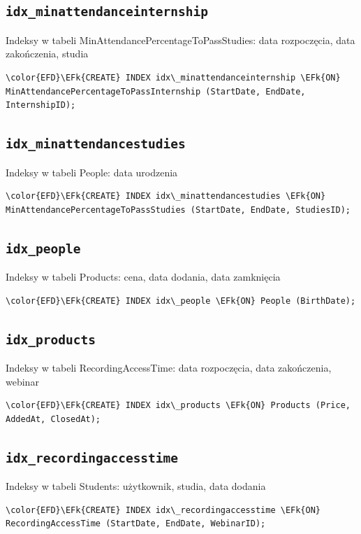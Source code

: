 \documentclass[11pt]{article}
\newcommand{\EFk}[1]{\textcolor{EFk}{\textbf{#1}}} %
\begin{document}
\subsection{\texttt{idx\_minattendanceinternship}}
\label{sec:org7eadbf9}
Indeksy w tabeli MinAttendancePercentageToPassStudies: data rozpoczęcia, data zakończenia, studia
\begin{Code}
\begin{Verbatim}
\color{EFD}\EFk{CREATE} INDEX idx\_minattendanceinternship \EFk{ON} MinAttendancePercentageToPassInternship (StartDate, EndDate, InternshipID);
\end{Verbatim}
\end{Code}
\subsection{\texttt{idx\_minattendancestudies}}
\label{sec:org62e0f5f}
Indeksy w tabeli People: data urodzenia
\begin{Code}
\begin{Verbatim}
\color{EFD}\EFk{CREATE} INDEX idx\_minattendancestudies \EFk{ON} MinAttendancePercentageToPassStudies (StartDate, EndDate, StudiesID);
\end{Verbatim}
\end{Code}
\subsection{\texttt{idx\_people}}
\label{sec:org503f09f}
Indeksy w tabeli Products: cena, data dodania, data zamknięcia
\begin{Code}
\begin{Verbatim}
\color{EFD}\EFk{CREATE} INDEX idx\_people \EFk{ON} People (BirthDate);
\end{Verbatim}
\end{Code}
\subsection{\texttt{idx\_products}}
\label{sec:org02d1ccd}
Indeksy w tabeli RecordingAccessTime: data rozpoczęcia, data zakończenia, webinar
\begin{Code}
\begin{Verbatim}
\color{EFD}\EFk{CREATE} INDEX idx\_products \EFk{ON} Products (Price, AddedAt, ClosedAt);
\end{Verbatim}
\end{Code}
\subsection{\texttt{idx\_recordingaccesstime}}
\label{sec:orgf6a53d2}
Indeksy w tabeli Students: użytkownik, studia, data dodania
\begin{Code}
\begin{Verbatim}
\color{EFD}\EFk{CREATE} INDEX idx\_recordingaccesstime \EFk{ON} RecordingAccessTime (StartDate, EndDate, WebinarID);
\end{Verbatim}
\end{Code}
\end{document}
